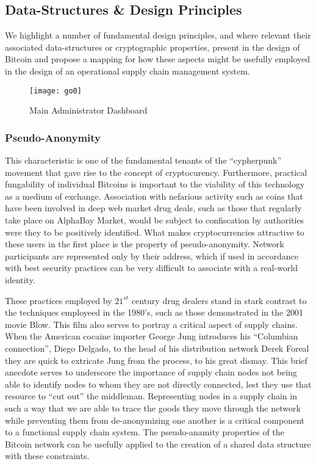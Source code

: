 \subsection{Data-Structures \& Design Principles}

We highlight a number of fundamental design principles, and where relevant their associated data-structures or cryptographic properties, present in the design of Bitcoin and propose a mapping for how these aspects might be usefully employed in the design of an operational supply chain management system. 

\begin{figure}
  \centering
    \texttt{[image: go0]}
  \caption{Main Administrator Dashboard}
\end{figure}

\subsubsection{Pseudo-Anonymity}

This characteristic is one of the fundamental tenants of the ``cypherpunk'' movement that gave rise to the concept of cryptocurency.
Furthermore, practical fungability of individual Bitcoins is important to the viability of this technology as a medium of exchange. 
Association with nefarious activity such as coins that have been involved in deep web market drug deals, such as those that regularly take place on AlphaBay Market, would be subject to confiscation by authorities were they to be positively identified. 
What makes cryptocurrencies attractive to these users in the first place is the property of pseudo-anonymity. 
Network participants are represented only by their address, which if used in accordance with best security practices can be very difficult to associate with a real-world identity. 

These practices employed by $21^{st}$ century drug dealers stand in stark contrast to the techniques employeed in the 1980's, such as those demonstrated in the 2001 movie Blow.
This film also serves to portray a critical aspect of supply chains. 
When the American cocaine importer George Jung introduces his ``Columbian connection'', Diego Delgado, to the head of his distribution network Derek Foreal they are quick to extricate Jung from the process, to his great dismay. 
This brief anecdote serves to underscore the importance of supply chain nodes not being able to identify nodes to whom they are not directly connected, lest they use that resource to ``cut out'' the middleman. 
Representing nodes in a supply chain in such a way that we are able to trace the goods they move through the network while preventing them from de-anonymizing one another is a critical component to a functional supply chain system. 
The pseudo-anamity properties of the Bitcoin network can be usefully applied to the creation of a shared data structure with these constraints. 

